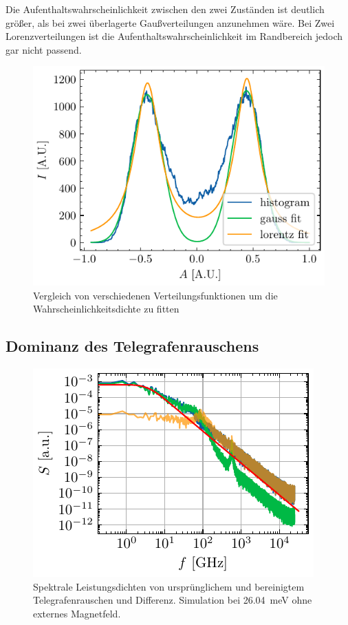 \documentclass[main.tex]{subfiles}
\begin{document}

Die Aufenthaltswahrscheinlichkeit zwischen den zwei Zuständen ist deutlich größer, als bei zwei überlagerte Gaußverteilungen anzunehmen wäre. Bei Zwei Lorenzverteilungen ist die Aufenthaltswahrscheinlichkeit im Randbereich jedoch gar nicht passend.

\begin{figure}[H]
    \centering
    \includegraphics{bilder/plots/theo-vis/hist_fit_comp.pdf}
    \caption{Vergleich von verschiedenen Verteilungsfunktionen um die Wahrscheinlichkeitsdichte zu fitten}\label{fig:fit_comp}
\end{figure}

\subsection{Dominanz des Telegrafenrauschens}

\begin{figure}[H]
    \centering
    \includegraphics{bilder/plots/Bz_0mT/spectral_power_densities_26.03meV.pdf}
    \caption{Spektrale Leistungsdichten von ursprünglichem und bereinigtem Telegrafenrauschen und Differenz. Simulation bei \SI{26.04}{\milli\electronvolt} ohne externes Magnetfeld.}\label{fig:spds}
\end{figure}
\end{document}
